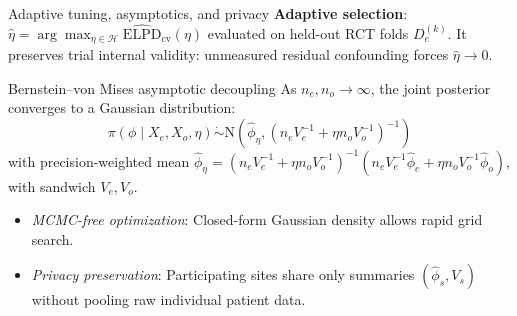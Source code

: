 \documentclass[t]{beamer}
\begin{document}
\begin{frame}{Adaptive tuning, asymptotics, and privacy}
    \textbf{Adaptive selection}: $\hat\eta = \arg\max_{\eta \in \mathcal{H}} \widehat{\text{ELPD}}_{\text{cv}}(\eta)$ evaluated on held-out RCT folds $D_e^{(k)}$.
    It preserves trial internal validity: unmeasured residual confounding forces $\hat\eta \to 0$.

    \begin{block}{Bernstein--von Mises asymptotic decoupling}
    As $n_e, n_o \to \infty$, the joint posterior converges to a Gaussian distribution:
    \begin{equation*}
        \pi(\phi \mid X_e, X_o, \eta) \mathrel{\dot{\sim}} \text{N}\left(\hat\phi_\eta, \left(n_e V_e^{-1} + \eta n_o V_o^{-1}\right)^{-1}\right)
    \end{equation*}
    with precision-weighted mean $\hat\phi_\eta = (n_e V_e^{-1} + \eta n_o V_o^{-1})^{-1}(n_e V_e^{-1}\hat\phi_e + \eta n_o V_o^{-1}\hat\phi_o)$, with sandwich $V_e, V_o$.
    \end{block}

    \begin{itemize}
        \item \emph{MCMC-free optimization}: Closed-form Gaussian density allows rapid grid search.
        \item \emph{Privacy preservation}: Participating sites share only summaries $(\hat\phi_s, V_s)$ without pooling raw individual patient data.
    \end{itemize}

\end{frame}
\end{document}
